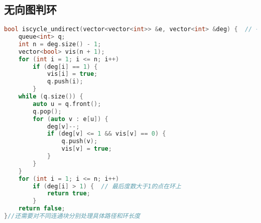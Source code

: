 \subsection{无向图判环}
\begin{lstlisting}[language=C++]
bool iscycle_undirect(vector<vector<int>> &e, vector<int> &deg) {  // 有环返回true
    queue<int> q;
    int n = deg.size() - 1;
    vector<bool> vis(n + 1);
    for (int i = 1; i <= n; i++)
        if (deg[i] == 1) {
            vis[i] = true;
            q.push(i);
        }
    while (q.size()) {
        auto u = q.front();
        q.pop();
        for (auto v : e[u]) {
            deg[v]--;
            if (deg[v] <= 1 && vis[v] == 0) {
                q.push(v);
                vis[v] = true;
            }
        }
    }
    for (int i = 1; i <= n; i++)
        if (deg[i] > 1) {  // 最后度数大于1的点在环上
            return true;
        }
    return false;
}//还需要对不同连通块分别处理具体路径和环长度
\end{lstlisting}
